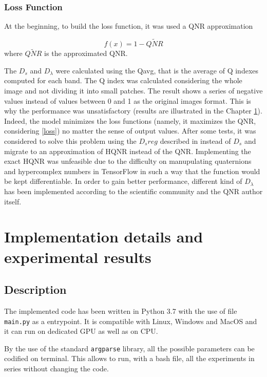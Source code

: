 \documentclass[12pt]{report}
\begin{document}
\subsection{Loss Function}

At the beginning, to build the loss function, it was used a QNR approximation 

\begin{equation}
    f(x) = 1 - \widetilde{QNR}
    \label{loss}
\end{equation}
%
where $\widetilde{QNR}$ is the approximated QNR.

The $D_s$ and $D_\lambda$ were calculated using the Qavg, that is the average of Q indexes computed for each band. The Q index was calculated considering the whole image and not
dividing it into small patches.
The result shows a series of negative values instead of values between 0 and 1 as the original images format.
This is why the performance was unsatisfactory (results are illustrated in the Chapter \ref{chap4}).
Indeed, the model minimizes the loss functions (namely, it maximizes the QNR, considering \ref{loss}) no matter 
the sense of output values.
After some tests, it was considered to solve this problem using the $D_sreg$ described in \cite{dsreg} instead of $D_s$  
and migrate to an approximation of HQNR instead of the QNR.
Implementing the exact HQNR was unfeasible due to the difficulty on manupulating quaternions and hypercomplex numbers in TensorFlow in such
a way that the function would be kept differentiable.
In order to gain better performance, different kind of $D_\lambda$ has been implemented according to the scientific community and the QNR author itself.

\chapter{Implementation details and experimental results}\label{chap4}
\section{Description}
\label{description}
The implemented code has been written in Python 3.7 with the use of file \texttt{main.py} as a entrypoint. 
It is compatible with Linux, Windows and MacOS and it can run on dedicated GPU as well as on CPU.

By the use of the standard \texttt{argparse} library, all the possible parameters can be codified on terminal.
This allows to run, with a bash file, all the experiments in series without changing the code.
\end{document}
